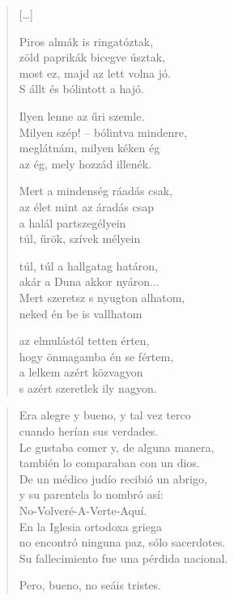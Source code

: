 \documentclass[11pt]{book}
\newcommand*{\centeredornament}{\centerline{\pgfornament[width=6cm]{88}}}
\begin{document}
\begin{verse}
  \textnormal{[\ldots]}

  Piros almák is ringatóztak, \\
  zöld paprikák bicegve úsztak, \\
  most ez, majd az lett volna jó. \\
  S állt és bólintott a hajó.

  Ilyen lenne az űri szemle. \\
  Milyen szép! -- bólintva mindenre, \\
  meglátnám, milyen kéken ég \\
  az ég, mely hozzád illenék.

  Mert a mindenség ráadás csak, \\
  az élet mint az áradás csap \\
  a halál partszegélyein \\
  túl, űrök, szívek mélyein

  túl, túl a hallgatag határon, \\
  akár a Duna akkor nyáron... \\
  Mert szeretsz s nyugton alhatom, \\
  neked én be is vallhatom

  az elmulástól tetten érten, \\
  hogy önmagamba én se fértem, \\
  a lelkem azért közvagyon \\
  s azért szeretlek ily nagyon.
\end{verse}

\newpage

\vspace*{-15mm}
\centeredornament



\begin{verse}
  Era alegre y bueno, y tal vez terco \\
  cuando herían sus verdades. \\
  Le gustaba comer y, de alguna manera, \\
  también lo comparaban con un dios. \\
  De un médico judío recibió un abrigo, \\
  y su parentela lo nombró así: \\
  No-Volveré-A-Verte-Aquí. \\
  En la Iglesia ortodoxa griega \\
  no encontró ninguna paz, sólo sacerdotes. \\
  Su fallecimiento fue una pérdida nacional.

  Pero, bueno, no seáis tristes.
\end{verse}
\end{document}
